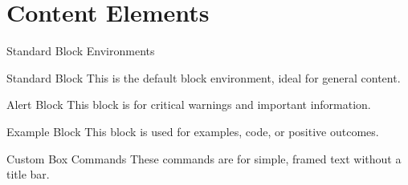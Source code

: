 \documentclass[serif]{NRSCISRO}
\begin{document}
\section{Content Elements}

\begin{frame}{Standard Block Environments}
    \begin{block}{Standard Block}
        This is the default block environment, ideal for general content.
    \end{block}
    
    \begin{alertblock}{Alert Block}
        This block is for critical warnings and important information.
    \end{alertblock}

    \begin{exampleblock}{Example Block}
        This block is used for examples, code, or positive outcomes.
    \end{exampleblock}
\end{frame}

\begin{frame}{Custom Box Commands}
    These commands are for simple, framed text without a title bar.
    
\end{frame}
\end{document}

